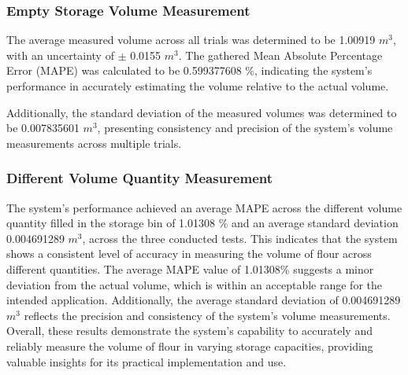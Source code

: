 \subsubsection{Empty Storage Volume Measurement}
The average measured volume across all trials was determined to be 1.00919 $m^{3}$, with an uncertainty of $\pm$ 0.0155 $m^{3}$. The gathered Mean Absolute Percentage Error (MAPE) was calculated to be 0.599377608 \%, indicating the system's performance in accurately estimating the volume relative to the actual volume.

Additionally, the standard deviation of the measured volumes was determined to be 0.007835601 $m^{3}$, presenting consistency and precision of the system's volume measurements across multiple trials.

\subsubsection{Different Volume Quantity Measurement}

The system's performance achieved an average MAPE across the different volume quantity filled in the storage bin of 1.01308 \% and an average standard deviation 0.004691289 $m^3$, across the three conducted tests. This indicates that the system shows a consistent level of accuracy in measuring the volume of flour across different quantities. The average MAPE value of 1.01308\% suggests a minor deviation from the actual volume, which is within an acceptable range for the intended application. Additionally, the average standard deviation of 0.004691289 $m^3$ reflects the precision and consistency of the system's volume measurements. Overall, these results demonstrate the system's capability to accurately and reliably measure the volume of flour in varying storage capacities, providing valuable insights for its practical implementation and use.


